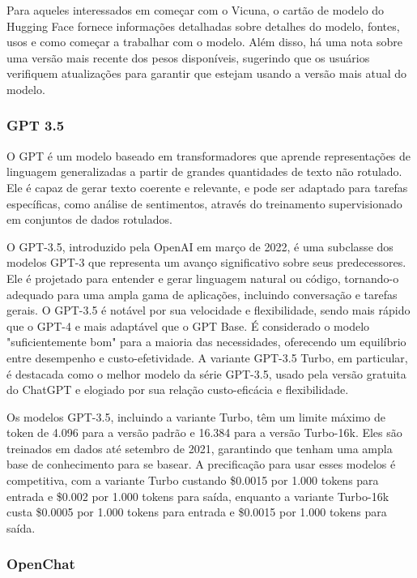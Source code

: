 Para aqueles interessados em começar com o Vicuna, o cartão de modelo do Hugging Face fornece informações detalhadas sobre detalhes do modelo, fontes, usos e como começar a trabalhar com o modelo. Além disso, há uma nota sobre uma versão mais recente dos pesos disponíveis, sugerindo que os usuários verifiquem atualizações para garantir que estejam usando a versão mais atual do modelo.

\subsubsection{GPT 3.5}

O GPT é um modelo baseado em transformadores que aprende representações de linguagem generalizadas a partir de grandes quantidades de texto não rotulado. Ele é capaz de gerar texto coerente e relevante, e pode ser adaptado para tarefas específicas, como análise de sentimentos, através do treinamento supervisionado em conjuntos de dados rotulados.

O GPT-3.5, introduzido pela OpenAI em março de 2022, é uma subclasse dos modelos GPT-3 que representa um avanço significativo sobre seus predecessores. Ele é projetado para entender e gerar linguagem natural ou código, tornando-o adequado para uma ampla gama de aplicações, incluindo conversação e tarefas gerais. O GPT-3.5 é notável por sua velocidade e flexibilidade, sendo mais rápido que o GPT-4 e mais adaptável que o GPT Base. É considerado o modelo "suficientemente bom" para a maioria das necessidades, oferecendo um equilíbrio entre desempenho e custo-efetividade. A variante GPT-3.5 Turbo, em particular, é destacada como o melhor modelo da série GPT-3.5, usado pela versão gratuita do ChatGPT e elogiado por sua relação custo-eficácia e flexibilidade.

Os modelos GPT-3.5, incluindo a variante Turbo, têm um limite máximo de token de 4.096 para a versão padrão e 16.384 para a versão Turbo-16k. Eles são treinados em dados até setembro de 2021, garantindo que tenham uma ampla base de conhecimento para se basear. A precificação para usar esses modelos é competitiva, com a variante Turbo custando \$0.0015 por 1.000 tokens para entrada e \$0.002 por 1.000 tokens para saída, enquanto a variante Turbo-16k custa \$0.0005 por 1.000 tokens para entrada e \$0.0015 por 1.000 tokens para saída.

\subsubsection{OpenChat}


